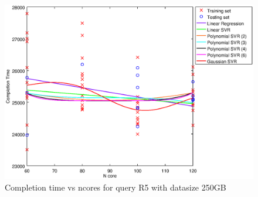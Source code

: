 
\begin {figure}[hbtp]
\centering
\includegraphics[width=\textwidth]{output/R5_250_ONLY_1_LINEAR_NCORE/plot_R5_250.eps}
\caption{Completion time vs ncores for query R5 with datasize 250GB}
\label{fig:only_1_linear_R5_250}
\end {figure}
